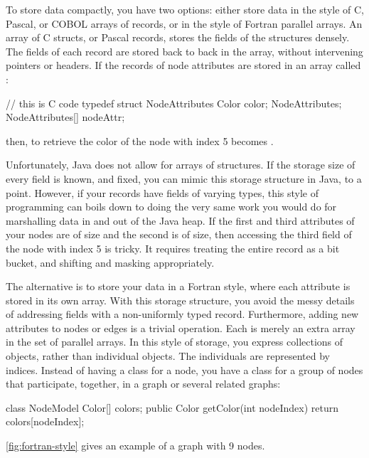 To store data compactly, you have two options: either store data in the style of
C, Pascal, or COBOL arrays of records, or in the style of Fortran parallel
arrays. An array of C structs, or Pascal records, stores the fields of the structures
densely. The fields of each record are stored back to back in the array, without
intervening pointers or headers. If the records of node attributes are stored in
an array called :
\begin{shortlisting}
// this is C code
typedef struct NodeAttributes {
   Color color;
} NodeAttributes;
NodeAttributes[] nodeAttr;
\end{shortlisting}
then, to retrieve the color of the node
with index 5 becomes .

Unfortunately, Java does not allow for arrays of structures. If the storage size
of every field is known, and fixed, you can mimic this storage structure in Java,
to a point. However, if your records have fields of varying types, this style of
programming can boils down to doing the very same work you would do for
marshalling data in and out of the Java heap. If the first and third attributes
of your nodes are of  size and the second is of  size,
then accessing the third field of the node with index 5 is tricky. It requires
treating the entire record as a bit bucket, and shifting and masking
appropriately.

\newcommand{\light}[1]{\footnotesize{\textcolor{Lighter}{#1}}}

The alternative is to store your data in a Fortran style, where each attribute is
stored in its own array. With this storage structure, you avoid the messy details
of addressing fields with a non-uniformly typed record. Furthermore, adding new
attributes to nodes or edges is a trivial operation. Each is merely an extra
array in the set of parallel arrays. In this style of storage, you express
collections of objects, rather than individual objects. The individuals are
represented by indices. Instead of having a class for a node, you have a class
for a group of nodes that participate, together, in a graph or several related
graphs:
\begin{shortlisting}
class NodeModel {
	Color[] colors;
	public Color getColor(int nodeIndex) {
		return colors[nodeIndex];
	}
}
\end{shortlisting}
\autoref{fig:fortran-style} gives an example of a graph with 9 nodes.


